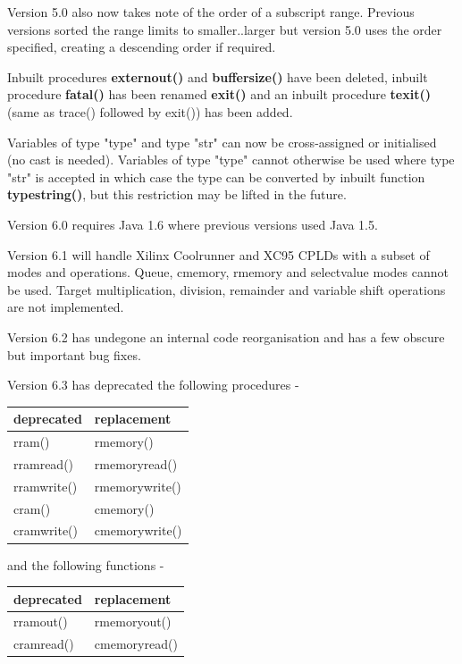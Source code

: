         Version 5.0 also now takes note of the order of a subscript range. Previous
        versions sorted the range limits to smaller..larger but version 5.0
        uses the order specified, creating a descending order if required.

        Inbuilt procedures {\bf externout()} and {\bf buffersize()} have been
        deleted, inbuilt procedure {\bf fatal()} has been renamed {\bf exit()} and
        an inbuilt procedure {\bf texit()} (same as trace() followed by exit()) has
        been added.

        Variables of type "type" and type "str" can now be cross-assigned or
        initialised (no cast is needed). Variables of type "type" cannot otherwise
        be used where type "str" is accepted in which case the type can be
        converted by inbuilt function {\bf typestring()}, but this restriction
        may be lifted in the future.

        Version 6.0 requires Java 1.6 where previous versions used Java 1.5.

        Version 6.1 will handle Xilinx Coolrunner and XC95 CPLDs with a subset
        of modes and operations. Queue, cmemory, rmemory and selectvalue modes
        cannot be used. Target multiplication, division, remainder and
        variable shift operations are not implemented.

        Version 6.2 has undegone an internal code reorganisation and has
        a few obscure but important bug fixes.

        Version 6.3 has deprecated the following procedures -

        \begin{tabular}{| l | l |}
        \hline
        deprecated & replacement \\
        \hline
        rram()      & rmemory()    \\
        rramread()  & rmemoryread()  \\
        rramwrite() & rmemorywrite() \\
        cram()      & cmemory()     \\
        cramwrite() & cmemorywrite() \\
        \hline
        \end{tabular}

        and the following functions -

        \begin{tabular}{| l | l |}
        \hline
        deprecated & replacement \\
        \hline
        rramout()   & rmemoryout()   \\
        cramread()  & cmemoryread()  \\
        \hline
        \end{tabular}

